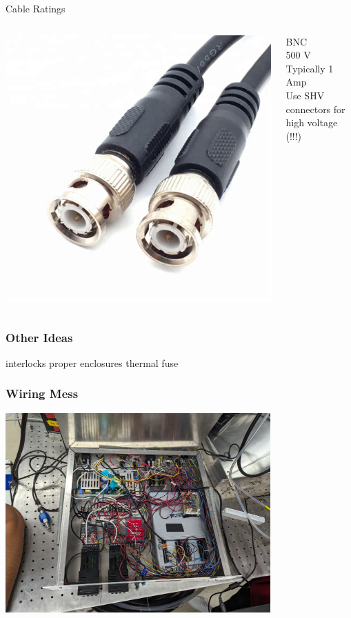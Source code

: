\documentclass{presentation}
\begin{document}
\begin{frame}{Cable Ratings}
  \begin{columns}
    \begin{column}{0.33\textwidth}
      \includegraphics[width=\textwidth]{"./HTB1je_xKXGWBuNjy0Fbq6z4sXXad.jpg"}
    \end{column}
    \begin{column}{0.67\textwidth}
      BNC
      \\
      500 V
      \\
      Typically 1 Amp
      \\
      Use SHV connectors for high voltage (!!!)
    \end{column}
  \end{columns}
\end{frame}

\begin{frame}\frametitle{Other Ideas}
  interlocks
  proper enclosures
  thermal fuse
\end{frame}

\begin{frame}\frametitle{Wiring Mess}
  \centering
  \includegraphics[width=4in]{"./wiring-mess.jpg"}
\end{frame}
\end{document}
